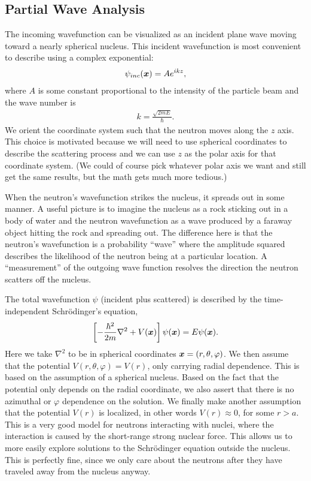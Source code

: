 \subsection{Partial Wave Analysis}

The incoming wavefunction can be visualized as an incident plane wave moving toward a nearly spherical nucleus. This incident wavefunction is most convenient to describe using a complex exponential:
\begin{align} \label{Eq:nuclearData_incidentWavefunction_SimpleForm}
  \psi_{inc}(\bm{x}) = A e^{ikz},
\end{align}
where $A$ is some constant proportional to the intensity of the particle beam and the wave number is
\begin{align}
  k = \frac{\sqrt{2mE}}{\hbar} .
\end{align}
We orient the coordinate system such that the neutron moves along the $z$ axis. This choice is motivated because we will need to use spherical coordinates to describe the scattering process and we can use $z$ as the polar axis for that coordinate system. (We could of course pick whatever polar axis we want and still get the same results, but the math gets much more tedious.) 

When the neutron's wavefunction strikes the nucleus, it spreads out in some manner. A useful picture is to imagine the nucleus as a rock sticking out in a body of water and the neutron wavefunction as a wave produced by a faraway object hitting the rock and spreading out. The difference here is that the neutron's wavefunction is a probability ``wave'' where the amplitude squared describes the likelihood of the neutron being at a particular location. A ``measurement'' of the outgoing wave function resolves the direction the neutron scatters off the nucleus.

The total wavefunction $\psi$ (incident plus scattered) is described by the time-independent Schr\"{o}dinger's equation,
\begin{align}
  \left[ -\frac{\hbar^2}{2m} \nabla^2 + V(\bm{x}) \right] \psi(\bm{x}) = E \psi(\bm{x}) .
\end{align}
Here we take $\nabla^2$ to be in spherical coordinates $\bm{x} = (r,\theta,\varphi)$. We then assume that the potential $V(r,\theta,\varphi) = V(r)$, only carrying radial dependence. This is based on the assumption of a spherical nucleus. Based on the fact that the potential only depends on the radial coordinate, we also assert that there is no azimuthal or $\varphi$ dependence on the solution. We finally make another assumption that the potential $V(r)$ is localized, in other words $V(r) \approx 0$, for some $r > a$. This is a very good model for neutrons interacting with nuclei, where the interaction is caused by the short-range strong nuclear force. This allows us to more easily explore solutions to the Schr\"{o}dinger equation outside the nucleus. This is perfectly fine, since we only care about the neutrons after they have traveled away from the nucleus anyway.


